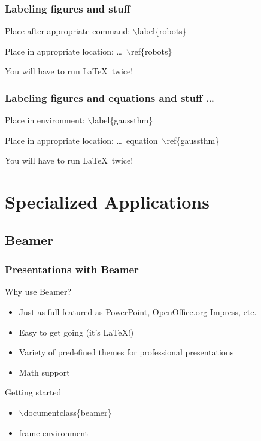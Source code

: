 \documentclass[ignorenonframetext]{beamer}
\begin{document}
\begin{frame}
  \frametitle{Labeling figures and stuff}
  \begin{block}{Place after appropriate command:}
    $\backslash$label\{robots\}
  \end{block}
  \begin{block}{Place in appropriate location:}
    \ldots\ $\backslash$ref\{robots\}
  \end{block}
  You will have to run \LaTeX\ twice!
\end{frame}
\begin{frame}
  \frametitle{Labeling figures and equations and stuff \ldots}
  \begin{block}{Place in environment:}
    $\backslash$label\{gaussthm\}
  \end{block}
  \begin{block}{Place in appropriate location:}
    \ldots\ equation~$\backslash$ref\{gaussthm\}
  \end{block}
  You will have to run \LaTeX\ twice!
\end{frame}


\section{Specialized Applications}
\subsection{Beamer}
\begin{frame}
  \frametitle{Presentations with Beamer}
  \begin{block}{Why use Beamer?}
    \begin{itemize}
    \item Just as full-featured as PowerPoint, OpenOffice.org Impress, etc.
    \item Easy to get going (it's \LaTeX!)
    \item Variety of predefined themes for professional presentations
    \item Math support
    \end{itemize}
  \end{block}
  \begin{block}{Getting started}
    \begin{itemize}
    \item $\backslash$documentclass\{beamer\}
    \item frame environment
    \end{itemize}
  \end{block}
\end{frame}
\end{document}
